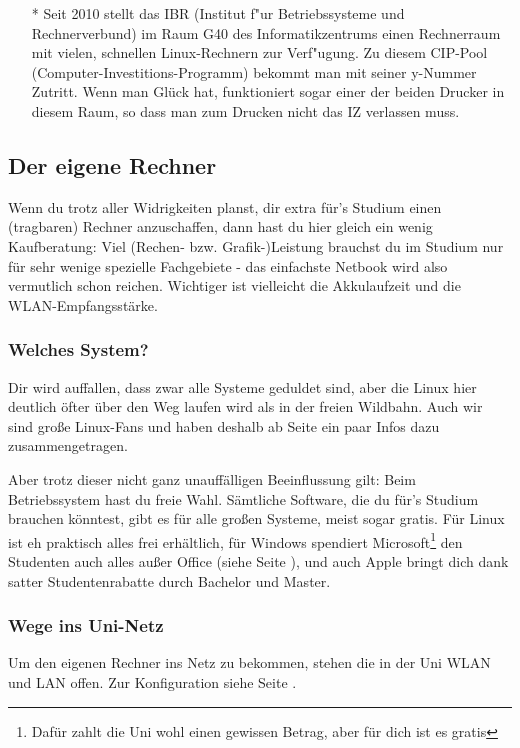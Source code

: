 \begin{center}
\begin{itemize}
\item[*] Seit 2010 stellt das IBR (Institut f"ur Betriebssysteme und Rechnerverbund)
im Raum G40 des Informatikzentrums einen Rechnerraum mit vielen, schnellen Linux-Rechnern 
zur Verf"ugung. Zu diesem CIP-Pool (Computer-Investitions-Programm) bekommt man mit 
seiner y-Nummer Zutritt. Wenn man Glück hat, funktioniert sogar einer der beiden Drucker
in diesem Raum, so dass man zum Drucken nicht das IZ verlassen muss.

\end{itemize}


\subsection{Der eigene Rechner}
Wenn du trotz aller Widrigkeiten planst, dir extra für's Studium einen 
(tragbaren) Rechner anzuschaffen, dann hast du hier gleich ein wenig 
Kaufberatung: Viel (Rechen- bzw. Grafik-)Leistung brauchst du im Studium 
nur für sehr wenige spezielle Fachgebiete - das einfachste Netbook wird also 
vermutlich schon reichen. Wichtiger ist vielleicht die Akkulaufzeit und die WLAN-Empfangsstärke.

\subsubsection{Welches System?}
Dir wird auffallen, dass zwar alle Systeme geduldet sind, aber die Linux hier
deutlich öfter über den Weg laufen wird als in der freien Wildbahn. Auch wir
sind große Linux-Fans und haben deshalb ab Seite \pageref{linux} ein paar Infos
dazu zusammengetragen.

Aber trotz dieser nicht ganz unauffälligen Beeinflussung gilt: Beim Betriebssystem 
hast du freie Wahl. Sämtliche Software, die du für's Studium brauchen 
könntest, gibt es für alle großen Systeme, meist sogar gratis. Für Linux ist eh 
praktisch alles frei erhältlich, für Windows spendiert 
Microsoft\footnote{Dafür zahlt die Uni wohl einen gewissen Betrag, aber für dich 
ist es gratis} den Studenten auch alles außer Office (siehe Seite \pageref{msdnaa}),
und auch Apple bringt dich dank satter Studentenrabatte durch Bachelor 
und Master. 

\subsubsection{Wege ins Uni-Netz}
Um den eigenen Rechner ins Netz zu bekommen, stehen die in der Uni WLAN und LAN 
offen. Zur Konfiguration siehe Seite \pageref{wlan}.


\end{center}

